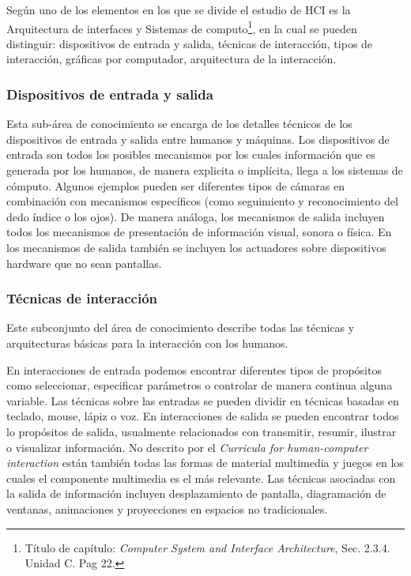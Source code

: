 Según \cite{sigchi1992curricula} uno de los elementos en los que se divide el estudio de HCI es la Arquitectura de interfaces y Sistemas de computo\footnote{Título de capítulo: \textit{Computer System and Interface Architecture}, Sec. 2.3.4. Unidad C. Pag 22. }, en la cual se pueden distinguir: dispositivos de entrada y salida, técnicas de interacción, tipos de interacción, gráficas por computador, arquitectura de la interacción.

\subsubsection{Dispositivos de entrada y salida}

Esta sub-área de conocimiento se encarga de los detalles técnicos de los dispositivos de entrada y salida entre humanos y máquinas. Los dispositivos de entrada son todos los posibles mecanismos por los cuales información que es generada por los humanos, de manera explicita o implícita, llega a los sistemas de cómputo. Algunos ejemplos pueden ser diferentes tipos de cámaras en combinación con mecanismos específicos (como seguimiento y reconocimiento del dedo índice o los ojos). De manera análoga, los mecanismos de salida incluyen todos los mecanismos de presentación de información visual, sonora o física. En los mecanismos de salida también se incluyen los actuadores sobre dispositivos hardware que no sean pantallas.

\subsubsection{Técnicas de interacción}

Este subconjunto del área de conocimiento describe todas las técnicas y arquitecturas básicas para la interacción con los humanos.

En interacciones de entrada podemos encontrar diferentes tipos de propósitos como seleccionar, especificar parámetros o controlar de manera continua alguna variable. Las técnicas sobre las entradas se pueden dividir en técnicas basadas en teclado, mouse, lápiz o voz. En interacciones de salida se pueden encontrar todos lo propósitos de salida, usualmente relacionados con transmitir, resumir, ilustrar o visualizar información. No descrito por el \textit{Curricula  for  human-computer  interaction} están también todas las formas de material multimedia y juegos en los cuales el componente multimedia es el más relevante. Las técnicas asociadas con la salida de información incluyen desplazamiento de pantalla, diagramación de ventanas, animaciones y proyecciones en espacios no tradicionales.

